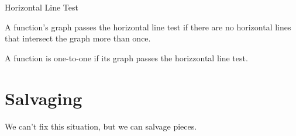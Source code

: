 \documentclass{ximera}
\begin{document}
\begin{example}
\begin{image}
\end{image}






\end{example}




\begin{definition} Horizontal Line Test


A function's graph passes the horizontal line test if there are no horizontal lines that intersect the graph more than once.


A function is one-to-one if its graph passes the horizzontal line test.

\end{definition}





\section{Salvaging}




We can't fix this situation, but we can salvage pieces. \\
\end{document}
